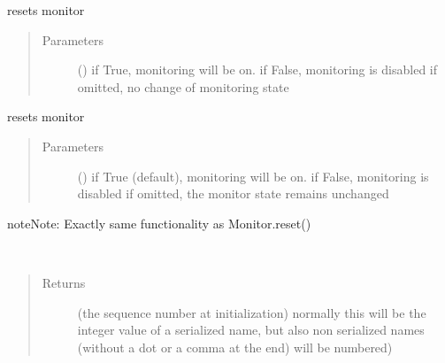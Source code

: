 \documentclass[letterpaper,10pt,english]{sphinxmanual}
\begin{document}
\begin{fulllineitems}
\begin{fulllineitems}
\end{fulllineitems}


\begin{fulllineitems}
\label{\detokenize{Reference:salabim.Monitor.reset}}
resets monitor
\begin{quote}\begin{description}
\item[{Parameters}] \leavevmode
{} () \textendash{} if True, monitoring will be on. 
if False, monitoring is disabled
if omitted, no change of monitoring state

\end{description}\end{quote}

\end{fulllineitems}


\begin{fulllineitems}
\label{\detokenize{Reference:salabim.Monitor.reset_monitors}}
resets monitor
\begin{quote}\begin{description}
\item[{Parameters}] \leavevmode
{} () \textendash{} if True (default), monitoring will be on. 
if False, monitoring is disabled 
if omitted, the monitor state remains unchanged

\end{description}\end{quote}

\begin{sphinxadmonition}{note}{Note:}
Exactly same functionality as Monitor.reset()
\end{sphinxadmonition}

\end{fulllineitems}


\begin{fulllineitems}
\label{\detokenize{Reference:salabim.Monitor.sequence_number}}~\begin{quote}\begin{description}
\item[{Returns}] \leavevmode
{} \textendash{} (the sequence number at initialization) 
normally this will be the integer value of a serialized name,
but also non serialized names (without a dot or a comma at the end)
will be numbered)


\end{description}
\end{quote}
\end{fulllineitems}
\end{fulllineitems}
\end{document}
